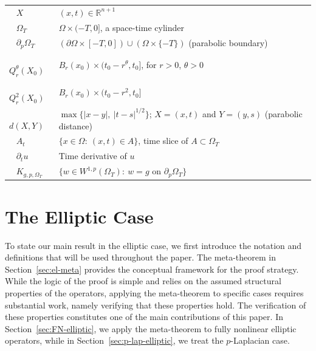 \documentclass[11pt,oneside,english]{amsart}
\numberwithin{equation}{section}
\theoremstyle{plain}
\numberwithin{equation}{section}
\begin{document}
\begin{longtable}[l]{l l}
\,\,\,\,\,$X $ &\qquad $(x ,t )\in\mathbb{R}^{n+1}$ \\[2mm]

\,\,\,\,\,$\Omega_T$ &\qquad $\Omega\times(-T,0]$, a space-time cylinder \\[2mm]

\,\,\,\,\,$\partial_p\Omega_T$ &\qquad $(\partial\Omega\times[-T,0])\cup (\Omega\times\{-T\})$  (parabolic boundary) \\[2mm]

\,\,\,\,\,$Q_r^\theta(X_0)$ &\qquad $B_r(x_0)\times(t_0-r^\theta,t_0]$, for $r>0$, $\theta>0$ \\[2mm]

\,\,\,\,\,$Q_r^2(X_0)$ &\qquad $B_r(x_0)\times(t_0-r^2,t_0]$ \\[2mm]


\,\,\,\,\,$d(X,Y)$
&\qquad
$\max\{|x-y|,\ |t-s|^{1/2}\}$; \quad  $X=(x,t)$ and $Y=(y,s)$ (parabolic distance)\\[2mm]
\,\,\,\,\,$A_t$ &\qquad $\{x\in\Omega:\ (x,t)\in A\}$, time slice of $A\subset\Omega_T$ \\[2mm]

\,\,\,\,\,$\partial_t u$ &\qquad Time derivative of $u$ \\[2mm]

\,\,\,\,\,$K_{g,p,\Omega_T}$ &\qquad $\{w\in W^{1,p}(\Omega_T):\ w=g \text{ on }\partial_p\Omega_T\}$ \\[2mm]

\end{longtable}
  








\section{The Elliptic Case}\label{sec:ell}
To state our main result in the elliptic case, we first introduce the notation and definitions that will be used throughout the paper. The meta-theorem in Section~\ref{sec:el-meta} provides the conceptual framework for the proof strategy. While the logic of the proof is simple and relies on the assumed structural properties of the operators, applying the meta-theorem to specific cases requires substantial work, namely verifying that these properties hold. The verification of these properties constitutes one of the main contributions of this paper. In Section~\ref{sec:FN-elliptic}, we apply the meta-theorem to fully nonlinear elliptic operators, while in Section~\ref{sec:p-lap-elliptic}, we treat the $p$-Laplacian case.
\end{document}
